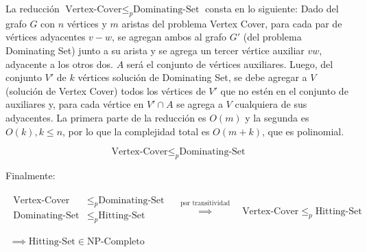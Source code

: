 
La reducción $\text{Vertex-Cover} \leq _{p} \text{Dominating-Set}$ consta en lo siguiente:
Dado del grafo $G$ con $n$ vértices y $m$ aristas del problema Vertex Cover, para cada par de vértices adyacentes $v-w$, se agregan ambos al grafo $G'$ (del problema Dominating Set) junto a su arista y se agrega un tercer vértice auxiliar $vw$, adyacente a los otros dos. $A$ será el conjunto de vértices auxiliares. Luego, del conjunto $V'$ de $k$ vértices solución de Dominating Set, se debe agregar a $V$ (solución de Vertex Cover) todos los vértices de $V'$ que no estén en el conjunto de auxiliares y, para cada vértice en $V' \cap A$ se agrega a $V$ cualquiera de sus adyacentes. La primera parte de la reducción es $O(m)$ y la segunda es $O(k),k \leq n$, por lo que la complejidad total es $O(m+k)$, que es polinomial.

\[\text{Vertex-Cover} \leq _{p} \text{Dominating-Set}\]


Finalmente:

\[
    \begin{array}{c}
        \begin{split}
            \text{Vertex-Cover}  & \leq _{p} \text{Dominating-Set} \\
            \text{Dominating-Set}  & \leq _{p} \text{Hitting-Set} \\
        \end{split}
        \quad \overset{ \text{por transitividad} }{ \implies  } \quad
        \text{Vertex-Cover}  \leq _{p} \text{Hitting-Set} \\ \\
        \implies \text{Hitting-Set} \in \text{NP-Completo}    
    \end{array}
\]

